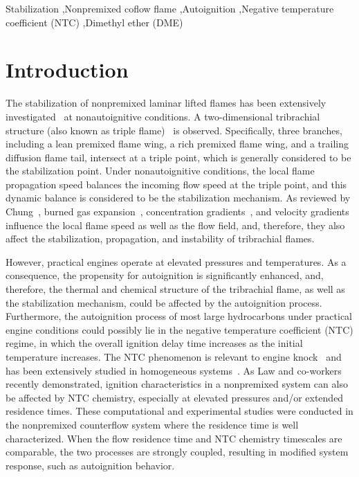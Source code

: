 \documentclass[review,3p,times]{elsarticle}
\begin{document}
\begin{frontmatter}
\begin{abstract}
\end{abstract}

\begin{keyword} 
Stabilization \sep Nonpremixed coflow flame \sep Autoignition \sep Negative temperature coefficient (NTC) \sep Dimethyl ether (DME) 
\end{keyword}

\end{frontmatter}



\section{Introduction}

The stabilization of nonpremixed laminar lifted flames has been extensively investigated~\cite{chung07} at nonautoignitive conditions. A two-dimensional tribrachial structure (also known as triple flame)~\cite{buckmaster02} is observed.  Specifically, three branches, including a lean premixed flame wing, a rich premixed flame wing, and a trailing diffusion flame tail, intersect at a triple point, which is generally considered to be the stabilization point.  Under nonautoignitive conditions, the local flame propagation speed balances the incoming flow speed at the triple point, and this dynamic balance is considered to be the stabilization mechanism.  As reviewed by Chung~\cite{chung07}, burned gas expansion~\cite{ruetsch95,lee97,plessing98,kioni99}, concentration gradients~\cite{dold89,hartley91,ghosal00}, and velocity gradients~\cite{kim07} influence the local flame speed as well as the flow field, and, therefore, they also affect the stabilization, propagation, and instability of tribrachial flames.

However, practical engines operate at elevated pressures and temperatures.  As a consequence, the propensity for autoignition is significantly enhanced, and, therefore, the thermal and chemical structure of the tribrachial flame, as well as the stabilization mechanism, could be affected by the autoignition process.  Furthermore, the autoignition process of most large hydrocarbons under practical engine conditions could possibly lie in the negative temperature coefficient (NTC) regime, in which the overall ignition delay time increases as the initial temperature increases.  The NTC phenomenon is relevant to engine knock~\cite{battin-leclerc08} and has been extensively studied in homogeneous systems~\cite{zador11}.  As Law and co-workers~\cite{law12,zhao13,deng14} recently demonstrated, ignition characteristics in a nonpremixed system can also be affected by NTC chemistry, especially at elevated pressures and/or extended residence times.  These computational and experimental studies were conducted in the nonpremixed counterflow system where the residence time is well characterized.  When the flow residence time and NTC chemistry timescales are comparable, the two processes are strongly coupled, resulting in modified system response, such as autoignition behavior.
\end{document}

